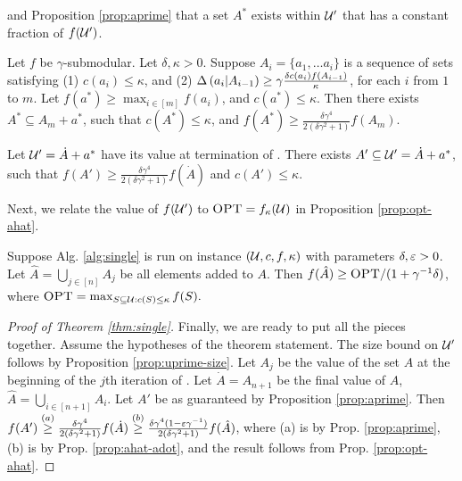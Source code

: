 and Proposition \ref{prop:aprime} that
a set $A^*$ exists within $\mathcal{U}'$ that has a constant fraction
of $f(\mathcal{U}')$. 
\begin{lemma} \label{lemma:value-inside-A}
  Let $f$ be $\gamma$-submodular.
  Let $\delta, \kappa > 0$. Suppose $A_i = \{ a_1, \ldots a_i \}$ is a sequence of sets satisfying
  (1) $c(a_i) \le \kappa$, and (2) $\Delta \left(  a_i  |  A_{i - 1}  \right) \ge \gamma \frac{\delta c( a_i ) f( A_{i -1 } ) }{ \kappa }$,
  for each $i$ from $1$ to $m$. Let $f( a^* ) \ge \max_{i \in [m]} f(a_i)$, and $c(a^*) \le \kappa$.
  Then there exists $A^* \subseteq A_m + a^*$, such that $c( A^* ) \le \kappa$, and
  $f( A^* ) \ge \frac{ \delta \gamma^4}{2(\delta\gamma^2 + 1)} f(A_m)$.
\end{lemma}
\begin{proposition} \label{prop:aprime}
  Let $\mathcal{U}' = \dot A + a^*$ have its value at termination of \qss.
  There exists $A' \subseteq \mathcal{U}' = \dot A + a^*$, such that  $f(A') \ge \frac{\delta \gamma^4}{2(\delta \gamma^2 + 1)} f(\dot A )$
  and $c(A') \le \kappa$. 
\end{proposition}
Next, we relate the value of $f(\mathcal{U}')$ to
$\textsc{OPT} = f_\kappa ( \mathcal{U} )$ in Proposition \ref{prop:opt-ahat}.
\begin{proposition} \label{prop:opt-ahat}
  Suppose Alg. \ref{alg:single} is run on instance $(\mathcal{U},c,f,\kappa )$ with
  parameters $\delta, \varepsilon > 0$. 
  Let $\hat A = \bigcup_{j \in [n]} A_j$ be all elements added to $A$.
  Then $f( \hat A ) \ge \textsc{OPT} / (1 + \gamma^{-1}\delta )$, where $\textsc{OPT} = \max_{S \subseteq \mathcal{U}: c(S) \le \kappa } f(S).$
\end{proposition}
\begin{proof}[Proof of Theorem \ref{thm:single}]
  Finally, we are ready to put all the pieces together.
  Assume the hypotheses of the theorem statement. 
  The size bound on $\mathcal{U}'$ follows by Proposition \ref{prop:uprime-size}.
  Let $A_j$ be the value of the set
  $A$ at the beginning of the $j$th iteration of \qss.
  Let $\dot A = A_{n+1}$ be the final value of $A$,
  $\hat A = \bigcup_{i \in [n + 1]} A_i$.
  Let $A'$ be as guaranteed by Proposition \ref{prop:aprime}.
  Then$ f(A') \overset{(a)}{\ge} \frac{\delta \gamma^4 }{2(\delta \gamma^2 + 1)} f( \dot A ) 
  \overset{(b)}{\ge} \frac{\delta \gamma^4(1 - \varepsilon \gamma^{-1})}{2(\delta \gamma^2 + 1)} f( \hat A )$,
  where (a) is by Prop. \ref{prop:aprime},
  (b) is by Prop. \ref{prop:ahat-adot},
  and the result follows from Prop. \ref{prop:opt-ahat}.
\end{proof}

